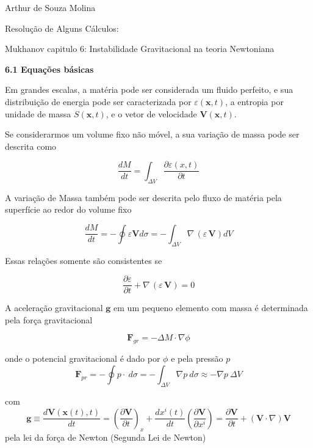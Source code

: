 \documentclass[a4paper,12pt]{article}
\begin{document}
	Arthur de Souza Molina
	
	Resolução de Alguns Cálculos:
	
	Mukhanov capitulo 6: Instabilidade Gravitacional na teoria Newtoniana
	
\begin{center}
	\textbf{6.1 Equações básicas}
\end{center}

Em grandes escalas, a matéria pode ser considerada um fluido perfeito, e sua distribuição de energia pode ser caracterizada por $\varepsilon (\textbf{x},t)$, a entropia por unidade de massa $S(\textbf{x},t)$, e o vetor de velocidade $\textbf{V}(\textbf{x},t)$.

Se considerarmos um volume fixo não móvel, a sua variação de massa pode ser descrita como

\begin{equation}
		\dfrac{dM}{dt} = \int_{\Delta V} \dfrac{\partial \varepsilon (x,t)}{\partial t}
\end{equation}

A variação de Massa também pode ser descrita pelo fluxo de matéria pela superfície ao redor do volume fixo

\begin{equation}
	\dfrac{dM}{dt} = - \oint \varepsilon \textbf{V} d\sigma = - \int_{\Delta V} \nabla \,(\varepsilon \, \textbf{V}) dV
\end{equation}

Essas relações somente são consistentes se

\begin{equation}
	\dfrac{\partial \varepsilon}{\partial t} +\nabla \,(\varepsilon \, \textbf{V}) = 0
\end{equation}

A aceleração gravitacional $\textbf{g}$ em um pequeno elemento com massa é determinada pela força gravitacional

\begin{equation}
	\textbf{F}_{gr} = - \Delta M \cdot \nabla \phi
\end{equation}

onde o potencial gravitacional é dado por $\phi$ e pela pressão $\textit{p}$
\begin{equation}
	\textbf{F}_{pr} = - \oint p \cdot\ d\sigma = - \int_{\Delta V} \nabla p\ d\sigma \approx - \nabla p \ \Delta V
\end{equation}

com 
\begin{equation}
	\textbf{g} \equiv \dfrac{d \textbf{V} (\textbf{x} (t), t)}{dt} = \left( \dfrac{\partial \textbf{V}}{\partial t} \right)_x + \dfrac{dx^i(t)}{dt}\left( \dfrac{\partial \textbf{V}}{\partial x^i} \right) = \frac{\partial \textbf{V}}{\partial t} + (\textbf{V} \cdot \nabla ) \textbf{V}
\end{equation}
\newline
pela lei da força de Newton (Segunda Lei de Newton)
\end{document}
